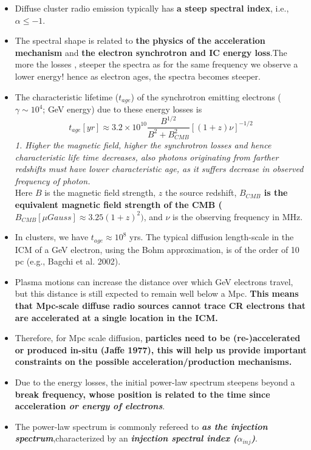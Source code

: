 \documentclass[12pt]{report}
\newcommand{\tbf}[1]{\textbf{#1}}
\newcommand{\tit}[1]{\textit{#1}}
\newcommand{\rr}[1]{\left[{#1}\right]}
\begin{document}
 \begin{itemize}
 \item Diffuse cluster radio emission typically has \tbf{a steep spectral index}, i.e., $\alpha \leq -1$. 
 \item The spectral shape is related to \tbf{the physics of the acceleration mechanism} and \tbf{the electron synchrotron and IC energy loss}.The more the losses , steeper the spectra as  for the same frequency  we observe a lower energy! hence as electron ages, the spectra becomes steeper.
 \item  The characteristic lifetime ($t_{age}$) of the synchrotron emitting electrons ($\gamma \sim 10^4$; GeV energy) due to these energy losses is
 \begin{equation}
 t_{age}[yr]\approx 3.2 \times 10^{10} \frac{B^{1/2}}{B^2+B^2_{CMB}}\rr{(1+z)\nu}^{-1/2}
 \end{equation}
 \tit{1. Higher the magnetic field, higher the synchrotron losses and hence characteristic life time decreases, also photons originating from farther redshifts must have lower characteristic age, as it suffers decrease in observed frequency of photon.}\\
Here $B$ is  the magnetic field strength, $z$ the source redshift,\tbf{ $B_{CMB}$ is the equivalent magnetic field strength of the CMB ($B_{CMB} [\mu Gauss] \approx 3.25(1+z)^2)$}, and $\nu$ is the observing frequency in MHz.
\item In clusters, we have $t_{age} \approx10^8$ yrs. The typical diffusion length-scale in the ICM of a GeV electron, using the Bohm approximation, is of the order of 10 pc (e.g., Bagchi et al. 2002). 

\item Plasma motions can increase the distance over which GeV electrons travel, but this distance is still expected to remain well below a Mpc. \textbf{This means that Mpc-scale diffuse radio sources cannot trace CR electrons that are accelerated at a single location in the ICM.}

\item  Therefore, for Mpc scale diffusion, \textbf{particles need to be (re-)accelerated or produced in-situ (Jaffe 1977), this will help us provide important constraints on the possible acceleration/production mechanisms.}
\item  Due to the energy losses, the initial power-law spectrum steepens beyond a \textbf{break frequency, whose position is related to the time since acceleration\tit{ or energy of electrons}}.
\item The power-law spectrum is commonly refereed to \tit{\tbf{as the injection spectrum}},characterized by an \tbf{\tit{injection spectral index ($\alpha_{inj}$)}}.
 \end{itemize}
\end{document}
